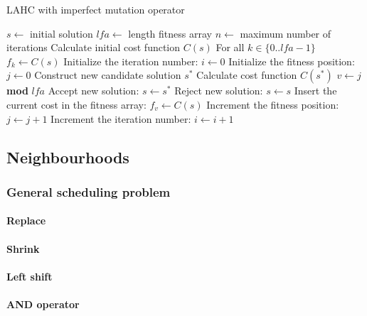\documentclass[]{article}
\begin{document}
\begin{algorithm}                      %
	\caption{LAHC with imperfect mutation operator}%
	\label{alg:lahc}                           %
	\begin{algorithmic}[1]                    %
		\REQUIRE $s \leftarrow$ initial solution
		\REQUIRE $lfa \leftarrow$ length fitness array
		\REQUIRE $n \leftarrow$ maximum number of iterations
		\STATE Calculate initial cost function $C(s)$
		\STATE For all $k \in \{0..lfa-1\}$ $f_k \leftarrow C(s)$
		\STATE Initialize the iteration number: $i \leftarrow 0$
		\STATE Initialize the fitness position: $j \leftarrow 0$
		\STATE Construct new candidate solution $s^*$
			\STATE Calculate cost function $C(s^*)$
			\STATE $v \leftarrow j$ \textbf{mod} $lfa$
				\STATE Accept new solution: $s \leftarrow s^*$
			\ELSE
				\STATE Reject new solution: $s \leftarrow s$
			\ENDIF
			\STATE Insert the current cost in the fitness array: $f_v \leftarrow C(s)$
			\STATE Increment the fitness position: $j \leftarrow j+1$
		\ENDIF
		\STATE Increment the iteration number: $i \leftarrow i+1$
		\ENDWHILE
	\end{algorithmic}
\end{algorithm}

\subsection{Neighbourhoods}
\label{subsec:neighbourhoods}
\subsubsection{General scheduling problem}
\paragraph{Replace}
\paragraph{Shrink}
\paragraph{Left shift}
\paragraph{AND operator}
\end{document}
